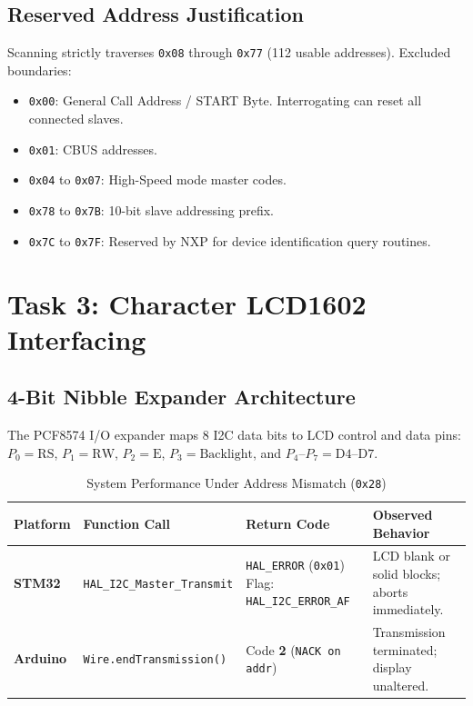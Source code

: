 \documentclass[11pt,a4paper,oneside]{report}
\begin{document}
\section{Reserved Address Justification}
Scanning strictly traverses \texttt{0x08} through \texttt{0x77} (112 usable addresses). Excluded boundaries:
\begin{itemize}
    \item \texttt{0x00}: General Call Address / START Byte. Interrogating can reset all connected slaves.
    \item \texttt{0x01}: CBUS addresses.
    \item \texttt{0x04} to \texttt{0x07}: High-Speed mode master codes.
    \item \texttt{0x78} to \texttt{0x7B}: 10-bit slave addressing prefix.
    \item \texttt{0x7C} to \texttt{0x7F}: Reserved by NXP for device identification query routines.
\end{itemize}

\chapter{Task 3: Character LCD1602 Interfacing}

\section{4-Bit Nibble Expander Architecture}
The PCF8574 I/O expander maps 8 I2C data bits to LCD control and data pins: $P_0=\text{RS}$, $P_1=\text{RW}$, $P_2=\text{E}$, $P_3=\text{Backlight}$, and $P_4\text{--}P_7=\text{D4--D7}$.

\begin{table}[h!]
\centering
\small
\caption{System Performance Under Address Mismatch (\texttt{0x28})}
\vspace{4pt}
\begin{tabularx}{\textwidth}{l p{4.0cm} p{3.5cm} X}
\toprule
\textbf{Platform} & \textbf{Function Call} & \textbf{Return Code} & \textbf{Observed Behavior} \\
\midrule
\textbf{STM32} & \texttt{HAL\_I2C\_Master\_Transmit} & \texttt{HAL\_ERROR} (\texttt{0x01}) \newline Flag: \texttt{HAL\_I2C\_ERROR\_AF} & LCD blank or solid blocks; aborts immediately. \\
\textbf{Arduino} & \texttt{Wire.endTransmission()} & Code \textbf{2} (\texttt{NACK on addr}) & Transmission terminated; display unaltered. \\
\bottomrule
\end{tabularx}
\end{table}
\end{document}
